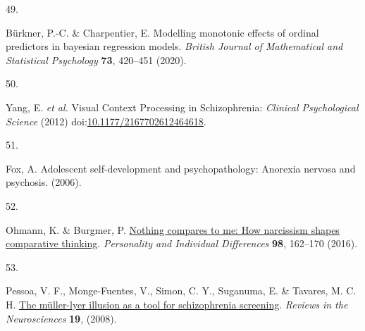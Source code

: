 \documentclass[
  man,floatsintext]{apa6}
\newlength{\cslhangindent}
\newlength{\csllabelwidth}
\newlength{\cslentryspacingunit} %
\newenvironment{CSLReferences}[2] %
 {%
  \setlength{\parindent}{0pt}
  \ifodd #1
  \let\oldpar\par
  \def\par{\hangindent=\cslhangindent\oldpar}
  \fi
  \setlength{\parskip}{#2\cslentryspacingunit}
 }%
 {}
\newcommand{\CSLLeftMargin}[1]{\parbox[t]{\csllabelwidth}{#1}}
\newcommand{\CSLRightInline}[1]{\parbox[t]{\linewidth - \csllabelwidth}{#1}\break}
\begin{document}
\begin{CSLReferences}{0}{0}
\leavevmode{}%
\CSLLeftMargin{49. }%
\CSLRightInline{Bürkner, P.-C. \& Charpentier, E. Modelling monotonic effects of ordinal predictors in bayesian regression models. \emph{British Journal of Mathematical and Statistical Psychology} \textbf{73}, 420--451 (2020).}

\leavevmode{}%
\CSLLeftMargin{50. }%
\CSLRightInline{Yang, E. \emph{et al.} Visual Context Processing in Schizophrenia: \emph{Clinical Psychological Science} (2012) doi:\href{https://doi.org/10.1177/2167702612464618}{10.1177/2167702612464618}.}

\leavevmode{}%
\CSLLeftMargin{51. }%
\CSLRightInline{Fox, A. Adolescent self-development and psychopathology: Anorexia nervosa and psychosis. (2006).}

\leavevmode{}%
\CSLLeftMargin{52. }%
\CSLRightInline{Ohmann, K. \& Burgmer, P. \href{https://doi.org/10.1016/j.paid.2016.03.069}{Nothing compares to me: How narcissism shapes comparative thinking}. \emph{Personality and Individual Differences} \textbf{98}, 162--170 (2016).}

\leavevmode{}%
\CSLLeftMargin{53. }%
\CSLRightInline{Pessoa, V. F., Monge-Fuentes, V., Simon, C. Y., Suganuma, E. \& Tavares, M. C. H. \href{https://doi.org/10.1515/REVNEURO.2008.19.2-3.91}{The müller-lyer illusion as a tool for schizophrenia screening}. \emph{Reviews in the Neurosciences} \textbf{19}, (2008).}

\end{CSLReferences}


\clearpage
\renewcommand{\listfigurename}{Figure captions}
\end{document}
